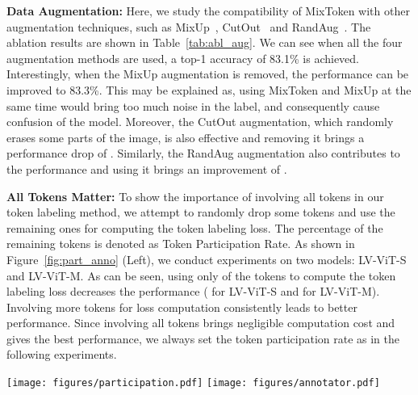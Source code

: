 \documentclass{article}
\newcommand{\myPara}[1]{\noindent\textbf{#1:}}
\begin{document}
\myPara{Data Augmentation}
Here, we study the compatibility of MixToken with other augmentation techniques,
such as MixUp~\cite{zhang2017mixup}, CutOut~\cite{zhong2020random} and RandAug~\cite{cubuk2020randaugment}.
The ablation results are shown in Table~\ref{tab:abl_aug}.
We can see when all the four augmentation methods are used, a top-1 accuracy of 
83.1\% is achieved.
Interestingly, when the MixUp augmentation is removed, the performance can be improved to 83.3\%.
This may be explained as, using MixToken and MixUp at the same time would bring 
too much noise in the label, and consequently cause confusion of the model.
Moreover, the CutOut augmentation, which randomly erases some parts of the image, 
is also effective and removing it brings a performance drop of .
Similarly, the RandAug augmentation also contributes to the performance and using it brings an improvement of .

\myPara{All Tokens Matter}
To show the importance of involving all tokens in our token labeling method, 
we attempt to randomly drop some tokens and use the remaining ones for computing the token labeling loss.
The percentage of the remaining tokens is denoted as Token Participation Rate. 
As shown in Figure~\ref{fig:part_anno} (Left), we conduct experiments on two models: LV-ViT-S and LV-ViT-M.
As can be seen, using only  of the tokens to compute the token labeling loss decreases the performance ( for LV-ViT-S and  for LV-ViT-M).
Involving more tokens for loss computation consistently leads to better performance.
Since involving all tokens brings negligible computation cost and gives the best performance, 
we always set the token participation rate as  in the following experiments.

\begin{figure*}[h]
    \centering
    \scriptsize
    \texttt{[image: figures/participation.pdf]}
    \texttt{[image: figures/annotator.pdf]}
\caption{\textbf{Left}: LV-ViT ImageNet Top-1 Accuracy w.r.t. the token participation rate while applying token labeling. Token participation rate indicates the percentage of patch tokens involved in computing the token labeling loss.
    This experiment reflects that all tokens matter for vision transformers. 
    \textbf{Right}: LV-ViT-S ImageNet Top-1 Accuracy w.r.t. different annotator models. The point size indicates the parameter number of the annotator model. Clearly, our token labeling objective is robust to different annotator models.}
    \label{fig:part_anno}
\end{figure*}
\end{document}
